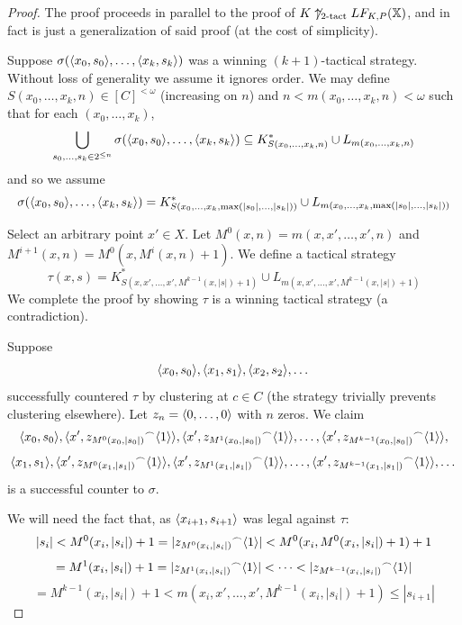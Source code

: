 \begin{proof}
The proof proceeds in parallel to the proof of $K\not\uparrow_{2\text{-tact}}LF_{K,P}(\mathbb{X})$, and in fact is just a generalization of said proof (at the cost of simplicity).

Suppose $\sigma(\langle x_0,s_0\rangle,\dots,\langle x_{k},s_{k}\rangle)$ was a winning $(k+1)$-tactical strategy. Without loss of generality we assume it ignores order. We may define $S(x_0,\dots,x_{k},n)\in [C]^{<\omega}$ (increasing on $n$) and $n<m(x_0,\dots,x_{k},n)<\omega$ such that for each $(x_0,\dots,x_{k})$,
  \[
    \bigcup_{s_0,\dots,s_k \in 2^{\leq n}} \sigma(\langle x_0,s_0\rangle,\dots,\langle x_{k},s_{k}\rangle) \subseteq 
    K^*_{S(x_0,\dots,x_{k},n)} \cup L_{m(x_0,\dots,x_{k},n)}
  \]
and so we assume
  \[
    \sigma(\langle x_0,s_0\rangle,\dots,\langle x_{k},s_{k}\rangle) =
    K^*_{S(x_0,\dots,x_{k},\max(|s_0|,\dots,|s_k|))} \cup L_{m(x_0,\dots,x_{k},\max(|s_0|,\dots,|s_k|))}
  \]

Select an arbitrary point $x' \in X$. Let $M^0(x,n)=m(x,x',\dots,x',n)$ and $M^{i+1}(x,n)=M^0(x,M^i(x,n)+1)$. We define a tactical strategy 
  \[
  \tau(x,s) = K^*_{S(x,x',\dots,x',M^{k-1}(x,|s|)+1)} \cup L_{m(x,x',\dots,x',M^{k-1}(x,|s|)+1)}
  \]
We complete the proof by showing $\tau$ is a winning tactical strategy (a contradiction).

Suppose
\[
\langle x_0, s_0\rangle, \langle x_1, s_1\rangle, \langle x_2, s_2\rangle, \dots
\]
successfully countered $\tau$ by clustering at $c\in C$ (the strategy trivially prevents clustering elsewhere). Let $z_n = \langle0,\dots,0\rangle$ with $n$ zeros. We claim
\[
  \langle x_0, s_0\rangle, 
  \langle x', {z_{M^0(x_0,|s_0|)}}^\frown\langle1\rangle\rangle,
  \langle x', {z_{M^1(x_0,|s_0|)}}^\frown\langle1\rangle\rangle, 
  \dots, 
  \langle x', {z_{M^{k-1}(x_0,|s_0|)}}^\frown\langle1\rangle\rangle,
\]
\[
  \langle x_1, s_1\rangle, 
  \langle x', {z_{M^0(x_1,|s_1|)}}^\frown\langle1\rangle\rangle, 
  \langle x', {z_{M^1(x_1,|s_1|)}}^\frown\langle1\rangle\rangle, 
  \dots, 
  \langle x', {z_{M^{k-1}(x_1,|s_1|)}}^\frown\langle1\rangle\rangle, 
  \dots
\]
is a successful counter to $\sigma$.

We will need the fact that, as $\langle x_{i+1},s_{i+1}\rangle$ was legal against $\tau$:
  \[
    |s_i| <
    M^0(x_i,|s_i|)+1 =
    |{z_{M^0(x_i,|s_i|)}}^\frown\langle1\rangle| <
    M^0(x_i,M^0(x_i,|s_i|)+1)+1 
  \]
  \[
    =
    M^1(x_i,|s_i|)+1 =
    |{z_{M^1(x_i,|s_i|)}}^\frown\langle1\rangle| <
    \dots <
    |{z_{M^{k-1}(x_i,|s_i|)}}^\frown\langle1\rangle| 
  \]
  \[
    =
    M^{k-1}(x_i,|s_i|) + 1 <
    m(x_i,x',\dots,x',M^{k-1}(x_i,|s_i|)+1) \leq
    |s_{i+1}|
  \]


\end{proof}
